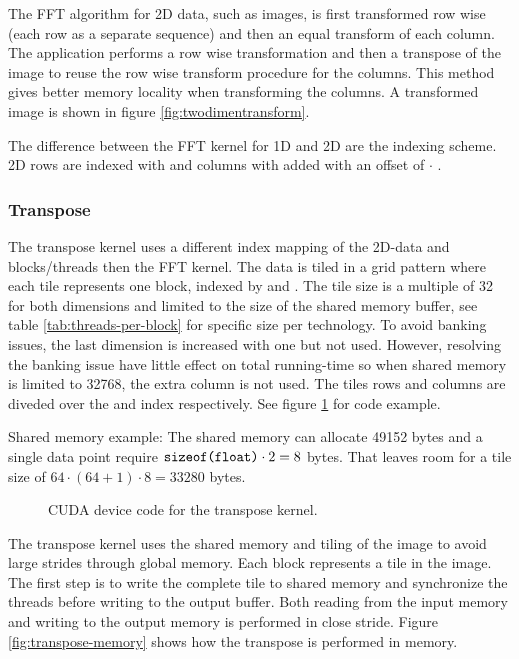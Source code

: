The \gls{FFT} algorithm for \gls{2D} data, such as images, is first transformed row wise (each row as a separate sequence) and then an equal transform of each column. The application performs a row wise transformation and then a transpose of the image to reuse the row wise transform procedure for the columns. This method gives better memory locality when transforming the columns. A transformed image is shown in figure \ref{fig:twodimentransform}.

The difference between the \gls{FFT} kernel for \gls{1D} and \gls{2D} are the indexing scheme. \gls{2D} rows are indexed with  and columns with  added with an offset of  $\cdot$ .

\subsubsection{Transpose}

The transpose kernel uses a different index mapping of the 2D-data and blocks/threads then the \gls{FFT} kernel. The data is tiled in a grid pattern where each tile represents one block, indexed by  and . The tile size is a multiple of 32 for both dimensions and limited to the size of the shared memory buffer, see table \ref{tab:threads-per-block} for specific size per technology. To avoid banking issues, the last dimension is increased with one but not used. However, resolving the banking issue have little effect on total running-time so when shared memory is limited to 32768, the extra column is not used. The tiles rows and columns are diveded over the  and  index respectively. See figure \ref{lst:cuda:device-transpose} for code example.

Shared memory example: The {\CU} shared memory can allocate 49152 bytes and a single data point require $\texttt{sizeof(float)} \cdot 2 = 8$ bytes. That leaves room for a tile size of $64 \cdot (64 + 1) \cdot 8 = 33280$ bytes.

\begin{figure}
	\centering
	\begin{framed}
			
	\end{framed}
	\caption{CUDA device code for the transpose kernel.}
	\label{lst:cuda:device-transpose}	
\end{figure}

The transpose kernel uses the shared memory and tiling of the image to avoid large strides through global memory. Each block represents a tile in the image. The first step is to write the complete tile to shared memory and synchronize the threads before writing to the output buffer. Both reading from the input memory and writing to the output memory is performed in close stride. Figure \ref{fig:transpose-memory} shows how the transpose is performed in memory.

